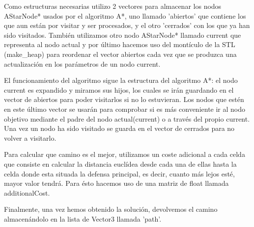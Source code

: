 Como estructuras necesarias utilizo 2 vectores para almacenar los nodos AStarNode* usados por el algoritmo A*, uno llamado 'abiertos' que contiene los que aun están por visitar y ser procesados, y el otro 'cerrados' con los que ya han sido visitados. También utilizamos otro nodo AStarNode* llamado current que representa al nodo actual y por último hacemos uso del montículo de la STL (make\_heap) para reordenar el vector abiertos cada vez que se produzca una actualización en los parámetros de un nodo current.

El funcionamiento del algoritmo sigue la estructura del algoritmo A*: el nodo current es expandido y miramos sus hijos, los cuales se irán guardando en el vector de abiertos para poder visitarlos si no lo estuvieran. Los nodos que estén en este último vector se usarán para comprobar si es más conveniente ir al nodo objetivo mediante el padre del nodo actual(current) o a través del propio current. Una vez un nodo ha sido visitado se guarda en el vector de cerrados para no volver a visitarlo.

Para calcular que camino es el mejor, utilizamos un coste adicional a cada celda que consiste en calcular la distancia euclídea desde cada una de ellas hasta la celda donde esta situada la defensa principal, es decir, cuanto más lejos esté, mayor valor tendrá. Para ésto hacemos uso de una matriz de float llamada additionalCost. 

Finalmente, una vez hemos obtenido la solución, devolvemos el camino almacenándolo en la lista de Vector3 llamada 'path'. 